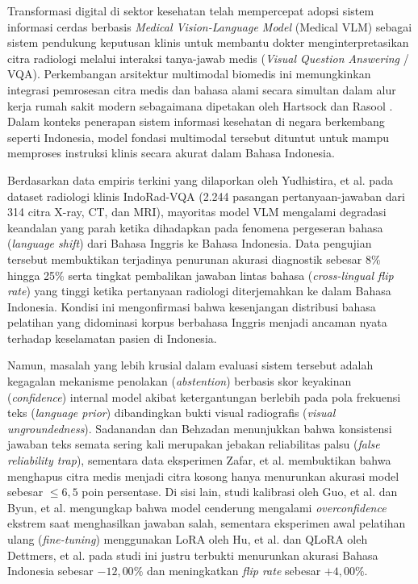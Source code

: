 \documentclass[a4paper,10pt,twoside]{article}
\begin{document}
Transformasi digital di sektor kesehatan telah mempercepat adopsi sistem informasi cerdas berbasis \textit{Medical Vision-Language Model} (Medical VLM) sebagai sistem pendukung keputusan klinis untuk membantu dokter menginterpretasikan citra radiologi melalui interaksi tanya-jawab medis (\textit{Visual Question Answering} / VQA). Perkembangan arsitektur multimodal biomedis ini memungkinkan integrasi pemrosesan citra medis dan bahasa alami secara simultan dalam alur kerja rumah sakit modern sebagaimana dipetakan oleh Hartsock dan Rasool \cite{hartsock2024review}. Dalam konteks penerapan sistem informasi kesehatan di negara berkembang seperti Indonesia, model fondasi multimodal tersebut dituntut untuk mampu memproses instruksi klinis secara akurat dalam Bahasa Indonesia.

Berdasarkan data empiris terkini yang dilaporkan oleh Yudhistira, et al. \cite{yudhistira2026does} pada dataset radiologi klinis IndoRad-VQA (2.244 pasangan pertanyaan-jawaban dari 314 citra X-ray, CT, dan MRI), mayoritas model VLM mengalami degradasi keandalan yang parah ketika dihadapkan pada fenomena pergeseran bahasa (\textit{language shift}) dari Bahasa Inggris ke Bahasa Indonesia. Data pengujian tersebut membuktikan terjadinya penurunan akurasi diagnostik sebesar 8\% hingga 25\% serta tingkat pembalikan jawaban lintas bahasa (\textit{cross-lingual flip rate}) yang tinggi ketika pertanyaan radiologi diterjemahkan ke dalam Bahasa Indonesia. Kondisi ini mengonfirmasi bahwa kesenjangan distribusi bahasa pelatihan yang didominasi korpus berbahasa Inggris menjadi ancaman nyata terhadap keselamatan pasien di Indonesia.

Namun, masalah yang lebih krusial dalam evaluasi sistem tersebut adalah kegagalan mekanisme penolakan (\textit{abstention}) berbasis skor keyakinan (\textit{confidence}) internal model akibat ketergantungan berlebih pada pola frekuensi teks (\textit{language prior}) dibandingkan bukti visual radiografis (\textit{visual ungroundedness}). Sadanandan dan Behzadan \cite{sadanandan2026mechanistically,sadanandan2026attention} menunjukkan bahwa konsistensi jawaban teks semata sering kali merupakan jebakan reliabilitas palsu (\textit{false reliability trap}), sementara data eksperimen Zafar, et al. \cite{zafar2026do} membuktikan bahwa menghapus citra medis menjadi citra kosong hanya menurunkan akurasi model sebesar $\le 6{,}5$ poin persentase. Di sisi lain, studi kalibrasi oleh Guo, et al. \cite{guo2017calibration} dan Byun, et al. \cite{byun2026overconfidence} mengungkap bahwa model cenderung mengalami \textit{overconfidence} ekstrem saat menghasilkan jawaban salah, sementara eksperimen awal pelatihan ulang (\textit{fine-tuning}) menggunakan LoRA oleh Hu, et al. \cite{hu2021lora} dan QLoRA oleh Dettmers, et al. \cite{dettmers2023qlora} pada studi ini justru terbukti menurunkan akurasi Bahasa Indonesia sebesar $-12{,}00\%$ dan meningkatkan \textit{flip rate} sebesar $+4{,}00\%$.
\end{document}
